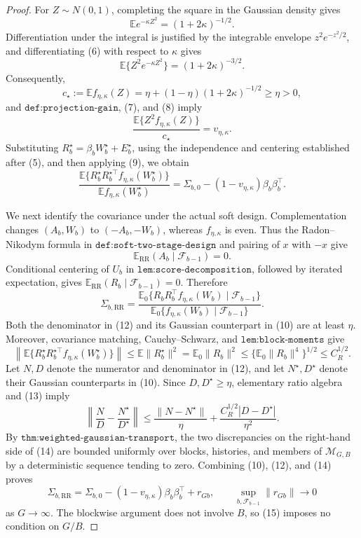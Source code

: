 \documentclass{article}
\begin{document}
\begin{proof}
For \(Z\sim N(0,1)\), completing the square in the Gaussian density gives
\[
\mathbb E e^{-\kappa Z^2}=(1+2\kappa)^{-1/2}.                               \tag{6}
\]
Differentiation under the integral is justified by the integrable envelope \(z^2e^{-z^2/2}\), and differentiating (6) with respect to \(\kappa\) gives
\[
\mathbb E\{Z^2e^{-\kappa Z^2}\}=(1+2\kappa)^{-3/2}.                        \tag{7}
\]
Consequently,
\[
c_\star:=\mathbb E f_{\eta,\kappa}(Z)
=\eta+(1-\eta)(1+2\kappa)^{-1/2}\geq\eta>0,                               \tag{8}
\]
and \(\texttt{def:projection-gain}\), (7), and (8) imply
\[
\frac{\mathbb E\{Z^2f_{\eta,\kappa}(Z)\}}{c_\star}
=v_{\eta,\kappa}.                                                          \tag{9}
\]
Substituting \(R_b^\star=\beta_bW_b^\star+E_b^\star\), using the independence and centering established after (5), and then applying (9), we obtain
\[
\frac{\mathbb E\{R_b^\star R_b^{\star\top}f_{\eta,\kappa}(W_b^\star)\}}
     {\mathbb E f_{\eta,\kappa}(W_b^\star)}
=\Sigma_{b,0}-(1-v_{\eta,\kappa})\beta_b\beta_b^\top.                    \tag{10}
\]

We next identify the covariance under the actual soft design. Complementation changes \((A_b,W_b)\) to \((-A_b,-W_b)\), whereas \(f_{\eta,\kappa}\) is even. Thus the Radon--Nikodym formula in \(\texttt{def:soft-two-stage-design}\) and pairing of \(x\) with \(-x\) give
\[
\mathbb E_{\mathrm{RR}}(A_b\mid\mathcal F_{b-1})=0.                       \tag{11}
\]
Conditional centering of \(U_b\) in \(\texttt{lem:score-decomposition}\), followed by iterated expectation, gives \(\mathbb E_{\mathrm{RR}}(R_b\mid\mathcal F_{b-1})=0\). Therefore
\[
\Sigma_{b,\mathrm{RR}}
=\frac{\mathbb E_0\{R_bR_b^\top f_{\eta,\kappa}(W_b)
                         \mid\mathcal F_{b-1}\}}
        {\mathbb E_0\{f_{\eta,\kappa}(W_b)
                         \mid\mathcal F_{b-1}\}}.                           \tag{12}
\]
Both the denominator in (12) and its Gaussian counterpart in (10) are at least \(\eta\). Moreover, covariance matching, Cauchy--Schwarz, and \(\texttt{lem:block-moments}\) give
\[
\left\|\mathbb E\{R_b^\star R_b^{\star\top}
                         f_{\eta,\kappa}(W_b^\star)\}\right\|
\leq\mathbb E\|R_b^\star\|^2
=\mathbb E_0\|R_b\|^2
\leq\{\mathbb E_0\|R_b\|^4\}^{1/2}
\leq C_R^{1/2}.                                                            \tag{13}
\]
Let \(N,D\) denote the numerator and denominator in (12), and let \(N^\star,D^\star\) denote their Gaussian counterparts in (10). Since \(D,D^\star\geq\eta\), elementary ratio algebra and (13) imply
\[
\left\|\frac ND-\frac{N^\star}{D^\star}\right\|
\leq\frac{\|N-N^\star\|}{\eta}
    +\frac{C_R^{1/2}|D-D^\star|}{\eta^2}.                                \tag{14}
\]
By \(\texttt{thm:weighted-gaussian-transport}\), the two discrepancies on the right-hand side of (14) are bounded uniformly over blocks, histories, and members of \(\mathcal M_{G,B}\) by a deterministic sequence tending to zero. Combining (10), (12), and (14) proves
\[
\Sigma_{b,\mathrm{RR}}
=\Sigma_{b,0}-(1-v_{\eta,\kappa})\beta_b\beta_b^\top+r_{Gb},
\qquad
\sup_{b,\mathcal F_{b-1}}\|r_{Gb}\|\longrightarrow0                       \tag{15}
\]
as \(G\to\infty\). The blockwise argument does not involve \(B\), so (15) imposes no condition on \(G/B\).


\end{proof}
\end{document}
